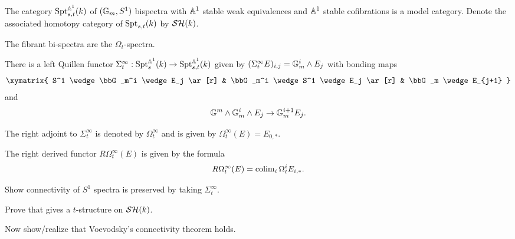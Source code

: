 \documentclass{amsart}%
\begin{document}
\begin{proposition}
  The category $\mathrm{Spt}_{s,t}^{\mathbb{A}^1}(k)$ of $(\mathbb{G}_m, S^1)$ bispectra with
  $\mathbb{A}^1$ stable weak equivalences and $\mathbb{A}^1$ stable cofibrations
  is a model category. Denote the associated homotopy category of
  $\mathrm{Spt}_{s,t}(k)$ by $\mathcal{SH}(k)$.
\end{proposition}

\begin{proposition}
  The fibrant bi-spectra are the $\Omega_t$-spectra. \cite[Theorem
  3.4]{H-Spectra}
\end{proposition}

\begin{proposition}
  There is a left Quillen functor
  $\Sigma^{\infty}_t : \mathrm{Spt}_s^{\mathbb{A}^1}(k) \to \mathrm{Spt}_{s,t}^{\mathbb{A}^1}(k)$
  given by $(\Sigma^{\infty}_tE)_{i,j} = \mathbb{G}_m^i\wedge E_j$ with bonding maps 
  \begin{equation*}
    \xymatrix{
      S^1 \wedge \bbG_m^i \wedge E_j \ar[r] & \bbG_m^i \wedge S^1 \wedge E_j \ar[r] & \bbG_m \wedge E_{j+1}
    }
  \end{equation*}
  and 
  \begin{equation*}
    \mathbb{G}^m \wedge \mathbb{G}_m^i \wedge E_j \to \mathbb{G}_m^{i+1} E_j.
  \end{equation*}

  The right adjoint to $\Sigma^{\infty}_t$ is denoted by
  $\Omega^{\infty}_t$ and is given by
  $\Omega^{\infty}_t(E) = E_{0,*}$.

  The right derived functor $R\Omega^{\infty}_t(E)$ is given by the formula 
  \begin{equation*}
    R\Omega^{\infty}_t(E) = \operatorname{colim}_i \Omega_t^i E_{i,*}.
  \end{equation*}
\end{proposition}


Show connectivity of $S^1$ spectra is preserved by taking
$\Sigma^{\infty}_t$.

Prove that \cite[Definition 5.2.1]{Mor03} gives a $t$-structure on
$\mathcal{SH}(k)$.

Now show/realize that Voevodsky's connectivity theorem holds. 
\end{document}
